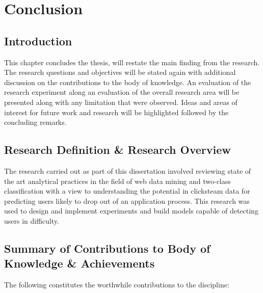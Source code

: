 \chapter{Conclusion} %

\label{Chapter6} %



\section{Introduction}
This chapter concludes the thesis, will restate the main finding from the research. The research questions and objectives will be stated again with additional discussion on the contributions to the body of knowledge. An evaluation of the research experiment along an evaluation of the overall research area will be presented along with any limitation that were observed. Ideas and areas of interest for future work and research will be highlighted followed by the concluding remarks.

\section{Research Definition \& Research Overview}
The research carried out as part of this dissertation involved reviewing state of the art analytical practices in the field of web data mining and two-class classification with a view to understanding the potential in clicksteam data for predicting users likely to drop out of an application process. This research was used to design and implement experiments and build models capable of detecting users in difficulty. 


\section{Summary of Contributions to Body of Knowledge \& Achievements}
The following constitutes the worthwhile contributions to the discipline:


